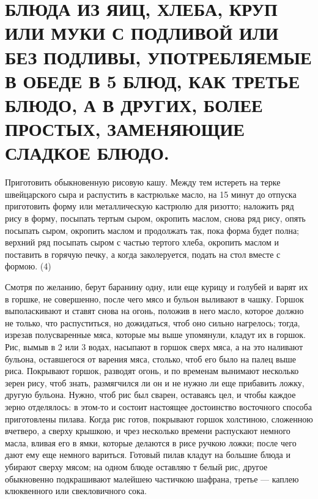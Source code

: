 \section{БЛЮДА ИЗ ЯИЦ, ХЛЕБА, КРУП ИЛИ МУКИ С ПОДЛИВОЙ ИЛИ БЕЗ ПОДЛИВЫ, УПОТРЕБЛЯЕМЫЕ В ОБЕДЕ В 5 БЛЮД, КАК ТРЕТЬЕ БЛЮДО, А В ДРУГИХ, БОЛЕЕ ПРОСТЫХ, ЗАМЕНЯЮЩИЕ СЛАДКОЕ БЛЮДО.} %


Приготовить обыкновенную рисовую кашу. Между тем истереть на терке швейцарского сыра и распустить в кастрюльке масло, на 15 минут до отпуска приготовить форму или металлическую кастрюлю для ризотто; наложить ряд рису в форму, посыпать тертым сыром, окропить маслом, снова ряд рису, опять посыпать сыром, окропить маслом и продолжать так, пока форма будет полна; верхний ряд посыпать сыром с частью тертого хлеба, окропить маслом и поставить в горячую печку, а когда заколеруется, подать на стол вместе с формою. (4) 


Смотря по желанию, берут баранину одну, или еще курицу и голубей и варят их в горшке, не совершенно, после чего мясо и бульон выливают в чашку. Горшок выполаскивают и ставят снова на огонь, положив в него масло, которое должно не только, что распуститься, но дожидаться, чтоб оно сильно нагрелось; тогда, изрезав полусваренные мяса, которые мы выше упомянули, кладут их в горшок. Рис, вымыв в 2 или 3 водах, насыпают в горшок сверх мяса, а на это наливают бульона, оставшегося от варения мяса, столько, чтоб его было на палец выше риса. Покрывают горшок, разводят огонь, и по временам вынимают несколько зерен рису, чтоб знать, размягчился ли он и не нужно ли еще прибавить ложку, другую бульона. Нужно, чтоб рис был сварен, оставаясь цел, и чтобы каждое зерно отделялось: в этом-то и состоит настоящее достоинство восточного способа приготовлены пилава. Когда рис готов, покрывают горшок холстиною, сложенною вчетверо, а сверху крышкою, и чрез несколько времени распускают немного масла, вливая его в ямки, которые делаются в рисе ручкою ложки; после чего дают ему еще немного вариться. Готовый пилав кладут на большие блюда и убирают сверху мясом; на одном блюде оставляю т белый рис, другое обыкновенно подкрашивают малейшею частичкою шафрана, третье — каплею клюквенного или свекловичного сока. 


